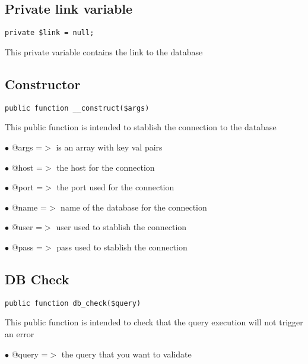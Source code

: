 \documentclass[a4paper]{book}
\begin{document}
\hypertarget{toc334}{}
\subsection{Private link variable}

\begin{lstlisting}
private $link = null;
\end{lstlisting}

This private variable contains the link to the database

\hypertarget{toc335}{}
\subsection{Constructor}

\begin{lstlisting}
public function __construct($args)
\end{lstlisting}

This public function is intended to stablish the connection to the database

\begin{compactitem}
\item[\color{myblue}$\bullet$] @args =$>$ is an array with key val pairs
\item[\color{myblue}$\bullet$] @host =$>$ the host for the connection
\item[\color{myblue}$\bullet$] @port =$>$ the port used for the connection
\item[\color{myblue}$\bullet$] @name =$>$ name of the database for the connection
\item[\color{myblue}$\bullet$] @user =$>$ user used to stablish the connection
\item[\color{myblue}$\bullet$] @pass =$>$ pass used to stablish the connection
\end{compactitem}

\hypertarget{toc336}{}
\subsection{DB Check}

\begin{lstlisting}
public function db_check($query)
\end{lstlisting}

This public function is intended to check that the query execution will not trigger an error

\begin{compactitem}
\item[\color{myblue}$\bullet$] @query =$>$ the query that you want to validate
\end{compactitem}
\end{document}
